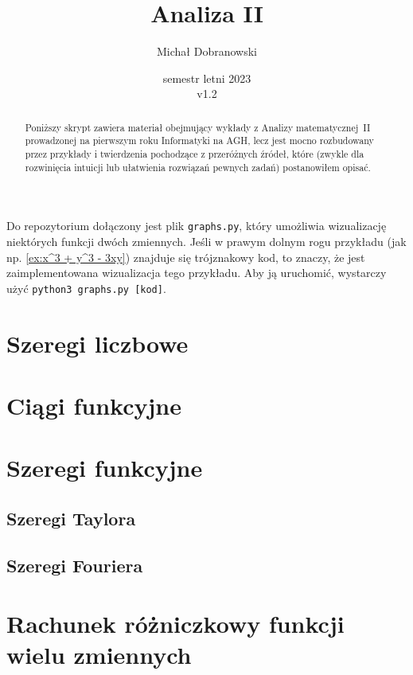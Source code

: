 \documentclass[11pt]{scrartcl}
\title{Analiza II}
\author{Michał Dobranowski}
\date{semestr letni 2023\\ v1.2}
\begin{document}
    \maketitle
    \begin{abstract}
        \noindent Poniższy skrypt zawiera materiał obejmujący wykłady z Analizy matematycznej~II prowadzonej na pierwszym roku Informatyki na AGH, lecz jest mocno rozbudowany przez przykłady i twierdzenia pochodzące z przeróżnych źródeł, które (zwykle dla rozwinięcia intuicji lub ułatwienia rozwiązań pewnych zadań) postanowiłem opisać.
    \end{abstract}
    \tableofcontents
    \newpage

    Do repozytorium dołączony jest plik \texttt{graphs.py}, który umożliwia wizualizację niektórych funkcji dwóch zmiennych. Jeśli w prawym dolnym rogu przykładu (jak np. \ref{ex:x^3 + y^3 - 3xy}) znajduje się trójznakowy kod, to znaczy, że jest zaimplementowana wizualizacja tego przykładu. Aby ją uruchomić, wystarczy użyć \texttt{python3 graphs.py [kod]}.

    \section{Szeregi liczbowe}
    

    \section{Ciągi funkcyjne}
    

    \section{Szeregi funkcyjne}
    
        \subsection{Szeregi Taylora}
        
        \subsection{Szeregi Fouriera}
        

    \section{Rachunek różniczkowy funkcji wielu zmiennych}
    
\end{document}
